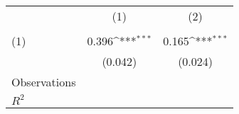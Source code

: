 {
\def\sym#1{\ifmmode^{#1}\else\(^{#1}\)\fi}
\begin{tabular}{l*{2}{c}}
\hline\hline
                    &\multicolumn{1}{c}{(1)}&\multicolumn{1}{c}{(2)}\\
                    &\multicolumn{1}{c}{} &\multicolumn{1}{c}{} \\
\hline
(1)                 &       0.396\sym{***}&       0.165\sym{***}\\
                    &     (0.042)         &     (0.024)         \\
\hline
Observations        &                     &                     \\
\(R^{2}\)           &                     &                     \\
\hline\hline
\end{tabular}
}
